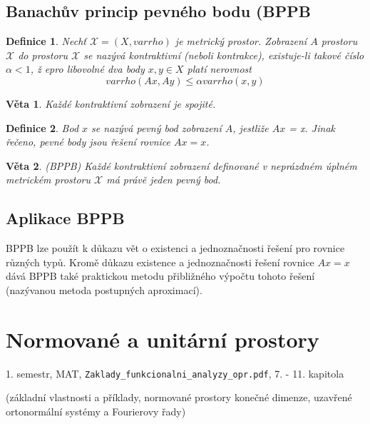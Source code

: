 \documentclass[a4paper, 11pt]{report}
\newtheorem{mydef}{Definice}[chapter]
\newtheorem{veta}{Věta}[chapter]
\begin{document}
\section{Banachův princip pevného bodu (BPPB}

\begin{mydef}
Nechť $\mathcal{X} = (X, varrho)$ je metrický prostor. Zobrazení $A$ prostoru $\mathcal{X}$ do prostoru $\mathcal{X}$ se nazývá \emph{kontraktivní} (neboli kontrakce), existuje-li takové číslo $\alpha < 1$, ž epro libovolné dva body $x, y \in X$ platí nerovnost
$$varrho(Ax, Ay) \leq \alpha varrho(x, y)$$
\end{mydef}

\begin{veta}
Každé kontraktivní zobrazení je spojité.
\end{veta}

\begin{mydef}
Bod $x$ se nazývá \emph{pevný bod} zobrazení $A$, jestliže $Ax$ = x. Jinak řečeno, pevné body jsou řešení rovnice $Ax = x$.
\end{mydef}

\begin{veta}
(BPPB) Každé kontraktivní zobrazení definované v neprázdném úplném metrickém prostoru $\mathcal{X}$ má právě jeden pevný bod.
\end{veta}

\section{Aplikace BPPB}
BPPB lze použít k důkazu vět o existenci a jednoznačnosti řešení pro rovnice různých typů. Kromě důkazu existence a jednoznačnosti řešení rovnice $Ax = x$ dává BPPB také praktickou metodu přibližného výpočtu tohoto řešení (nazývanou metoda postupných aproximací).




\chapter{Normované a unitární prostory} \label{cha:13}

1. semestr, MAT, \texttt{Zaklady\_funkcionalni\_analyzy\_opr.pdf}, 7. -  11. kapitola

(základní vlastnosti a příklady, normované prostory konečné dimenze, uzavřené ortonormální systémy a Fourierovy řady)
\end{document}
